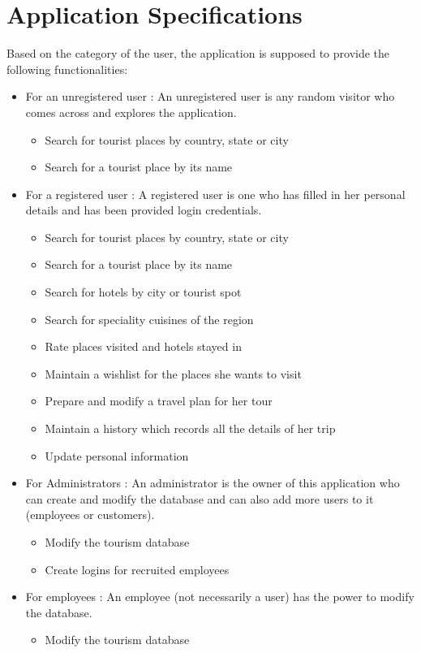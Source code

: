 \documentclass[11pt]{article}
\begin{document}
\section{Application Specifications}
Based on the category of the user, the application is supposed to provide the following functionalities:
\begin{itemize}
\item For an unregistered user : An unregistered user is any random visitor who comes across and explores the application.
\begin{itemize}
\item Search for tourist places by country, state or city
\item Search for a tourist place by its name
\end{itemize}
\item For a registered user : A registered user is one who has filled in her personal details and has been provided login credentials.
\begin{itemize}
\item Search for tourist places by country, state or city
\item Search for a tourist place by its name
\item Search for hotels by city or tourist spot
\item Search for speciality cuisines of the region
\item Rate places visited and hotels stayed in 
\item Maintain a wishlist for the places she wants to visit
\item Prepare and modify a travel plan for her tour
\item Maintain a history which records all the details of her trip
\item Update personal information
\end{itemize}
\item For Administrators : An administrator is the owner of this application who can create and modify the database and can also add more users to it (employees or customers).
\begin{itemize}
\item Modify the tourism database
\item Create logins for recruited employees
\end{itemize}
\item For employees : An employee (not necessarily a user) has the power to modify the database.
\begin{itemize}
\item Modify the tourism database
\end{itemize}
\end{itemize}
\end{document}
